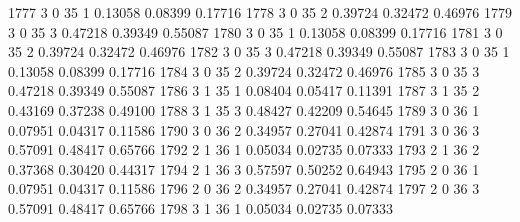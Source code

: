 \documentclass{article}
\begin{document}
\begin{Woutput}
1777      3       0      35       1       0.13058    0.08399    0.17716
1778      3       0      35       2       0.39724    0.32472    0.46976
1779      3       0      35       3       0.47218    0.39349    0.55087
1780      3       0      35       1       0.13058    0.08399    0.17716
1781      3       0      35       2       0.39724    0.32472    0.46976
1782      3       0      35       3       0.47218    0.39349    0.55087
1783      3       0      35       1       0.13058    0.08399    0.17716
1784      3       0      35       2       0.39724    0.32472    0.46976
1785      3       0      35       3       0.47218    0.39349    0.55087
1786      3       1      35       1       0.08404    0.05417    0.11391
1787      3       1      35       2       0.43169    0.37238    0.49100
1788      3       1      35       3       0.48427    0.42209    0.54645
1789      3       0      36       1       0.07951    0.04317    0.11586
1790      3       0      36       2       0.34957    0.27041    0.42874
1791      3       0      36       3       0.57091    0.48417    0.65766
1792      2       1      36       1       0.05034    0.02735    0.07333
1793      2       1      36       2       0.37368    0.30420    0.44317
1794      2       1      36       3       0.57597    0.50252    0.64943
1795      2       0      36       1       0.07951    0.04317    0.11586
1796      2       0      36       2       0.34957    0.27041    0.42874
1797      2       0      36       3       0.57091    0.48417    0.65766
1798      3       1      36       1       0.05034    0.02735    0.07333


\end{Woutput}
\end{document}
